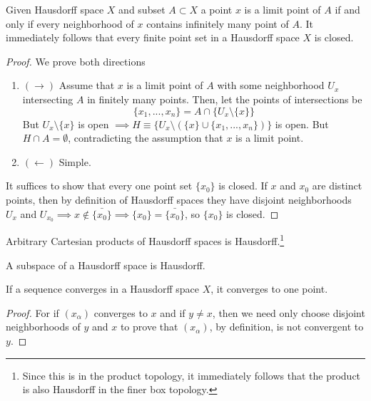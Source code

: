   \begin{theorem}
    Given Hausdorff space $X$ and subset $A \subset X$ a point $x$ is a limit point of $A$ if and only if every neighborhood of $x$ contains infinitely many point of $A$. It immediately follows that every finite point set in a Hausdorff space $X$ is closed. 
  \end{theorem}
  \begin{proof}
    We prove both directions
    \begin{enumerate}
      \item $(\rightarrow)$ Assume that $x$ is a limit point of $A$ with some neighborhood $U_x$ intersecting $A$ in finitely many points. Then, let the points of intersections be 
      \begin{equation}
        \{x_1, ..., x_n\} = A \cap \{U_x \setminus \{x\} \}
      \end{equation}
      But $U_x \setminus \{x\}$ is open $\implies H \equiv \{U_x \setminus ( \{x\} \cup \{x_1, ..., x_n\})\}$ is open. But $H \cap A = \emptyset$, contradicting the assumption that $x$ is a limit point. 

      \item $(\leftarrow)$ Simple. 
    \end{enumerate}
    It suffices to show that every one point set $\{x_0\}$ is closed. If $x$ and $x_0$ are distinct points, then by definition of Hausdorff spaces they have disjoint neighborhoods $U_x$ and $U_{x_0} \implies x \not\in \bar{\{x_0\}} \implies \{x_0\} = \bar{\{x_0\}}$, so $\{x_0\}$ is closed. 
  \end{proof}

  \begin{lemma}
    Arbitrary Cartesian products of Hausdorff spaces is Hausdorff.\footnote{Since this is in the product topology, it immediately follows that the product is also Hausdorff in the finer box topology.}
  \end{lemma}

  \begin{lemma}
    A subspace of a Hausdorff space is Hausdorff. 
  \end{lemma}

  \begin{theorem}
    If a sequence converges in a Hausdorff space $X$, it converges to one point. 
  \end{theorem}
  \begin{proof}
    For if $(x_\alpha)$ converges to $x$ and if $y \neq x$, then we need only choose disjoint neighborhoods of $y$ and $x$ to prove that $(x_\alpha)$, by definition, is not convergent to $y$.
  \end{proof}


